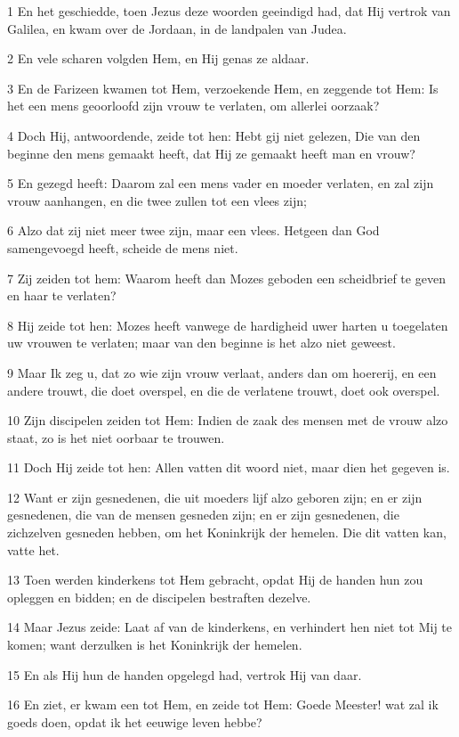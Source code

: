 \par 1 En het geschiedde, toen Jezus deze woorden geeindigd had, dat Hij vertrok van Galilea, en kwam over de Jordaan, in de landpalen van Judea.
\par 2 En vele scharen volgden Hem, en Hij genas ze aldaar.
\par 3 En de Farizeen kwamen tot Hem, verzoekende Hem, en zeggende tot Hem: Is het een mens geoorloofd zijn vrouw te verlaten, om allerlei oorzaak?
\par 4 Doch Hij, antwoordende, zeide tot hen: Hebt gij niet gelezen, Die van den beginne den mens gemaakt heeft, dat Hij ze gemaakt heeft man en vrouw?
\par 5 En gezegd heeft: Daarom zal een mens vader en moeder verlaten, en zal zijn vrouw aanhangen, en die twee zullen tot een vlees zijn;
\par 6 Alzo dat zij niet meer twee zijn, maar een vlees. Hetgeen dan God samengevoegd heeft, scheide de mens niet.
\par 7 Zij zeiden tot hem: Waarom heeft dan Mozes geboden een scheidbrief te geven en haar te verlaten?
\par 8 Hij zeide tot hen: Mozes heeft vanwege de hardigheid uwer harten u toegelaten uw vrouwen te verlaten; maar van den beginne is het alzo niet geweest.
\par 9 Maar Ik zeg u, dat zo wie zijn vrouw verlaat, anders dan om hoererij, en een andere trouwt, die doet overspel, en die de verlatene trouwt, doet ook overspel.
\par 10 Zijn discipelen zeiden tot Hem: Indien de zaak des mensen met de vrouw alzo staat, zo is het niet oorbaar te trouwen.
\par 11 Doch Hij zeide tot hen: Allen vatten dit woord niet, maar dien het gegeven is.
\par 12 Want er zijn gesnedenen, die uit moeders lijf alzo geboren zijn; en er zijn gesnedenen, die van de mensen gesneden zijn; en er zijn gesnedenen, die zichzelven gesneden hebben, om het Koninkrijk der hemelen. Die dit vatten kan, vatte het.
\par 13 Toen werden kinderkens tot Hem gebracht, opdat Hij de handen hun zou opleggen en bidden; en de discipelen bestraften dezelve.
\par 14 Maar Jezus zeide: Laat af van de kinderkens, en verhindert hen niet tot Mij te komen; want derzulken is het Koninkrijk der hemelen.
\par 15 En als Hij hun de handen opgelegd had, vertrok Hij van daar.
\par 16 En ziet, er kwam een tot Hem, en zeide tot Hem: Goede Meester! wat zal ik goeds doen, opdat ik het eeuwige leven hebbe?
